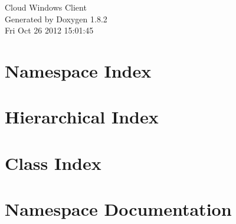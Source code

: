 \documentclass{book}
\begin{document}
\hypersetup{pageanchor=false,citecolor=blue}
\begin{titlepage}
\vspace*{7cm}
\begin{center}
{\Large Cloud Windows Client }\\
\vspace*{1cm}
{\large Generated by Doxygen 1.8.2}\\
\vspace*{0.5cm}
{\small Fri Oct 26 2012 15:01:45}\\
\end{center}
\end{titlepage}
\clearemptydoublepage
{}
\tableofcontents
\clearemptydoublepage
{}
\hypersetup{pageanchor=true,citecolor=blue}
\chapter{Namespace Index}

\chapter{Hierarchical Index}

\chapter{Class Index}

\chapter{Namespace Documentation}


















\end{document}
